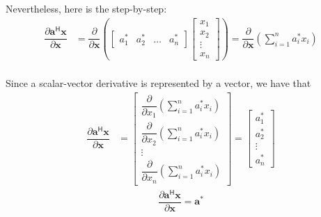 \documentclass{article}
\newcommand{\hermit}{\mathsf{H}}
\begin{document}
Nevertheless, here is the step-by-step:
\begin{align}
    \dfrac{\partial \mathbf{a}^\hermit \mathbf{x}}{\partial \mathbf{x}} &= \dfrac{\partial}{\partial \mathbf{x}} \left(
    \begin{bmatrix}
        a^*_1 & a^*_2 & \dots & a^*_n
    \end{bmatrix} \begin{bmatrix}
        x_{1} \\ x_{2} \\ \vdots \\ x_{n}
    \end{bmatrix} \right) 
    = \dfrac{\partial}{\partial \mathbf{x}} \left( \sum_{i = 1}^n a^*_ix_i \right) \\
\end{align}

Since a scalar-vector derivative is represented by a vector, we have that
\begin{align}
    \dfrac{\partial \mathbf{a}^\hermit \mathbf{x}}{\partial \mathbf{x}} &= \begin{bmatrix}
        \dfrac{\partial}{\partial x_1} \left( \sum_{i = 1}^n a^*_ix_i \right) \\ \dfrac{\partial}{\partial x_2} \left( \sum_{i = 1}^n a^*_ix_i \right) \\ \vdots \\ \dfrac{\partial}{\partial x_n} \left( \sum_{i = 1}^n a^*_ix_i \right) 
    \end{bmatrix}
    = \begin{bmatrix}
        a^*_1 \\ a^*_2 \\ \vdots \\ a^*_n
    \end{bmatrix}
\end{align}
\begin{align}
    \boxed{\dfrac{\partial \mathbf{a}^\hermit \mathbf{x}}{\partial \mathbf{x}} = \mathbf{a}^*}
\end{align}
\end{document}
